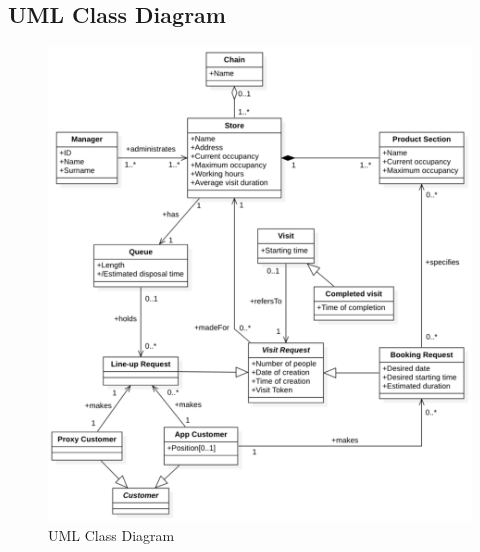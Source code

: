 \documentclass[a4paper,oneside,11pt]{book}   %
\begin{document}
    \subsection{UML Class Diagram} 
    \begin{figure}[H]
        \centering
        \includegraphics[width=\textwidth, height=\textheight, keepaspectratio]{pictures/uml_class_diagram}
        \caption{UML Class Diagram}
        \label{figure:uml}
    \end{figure}
    \newpage
\end{document}

